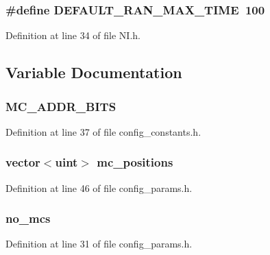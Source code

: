 \subsubsection[{DEFAULT\_\-RAN\_\-MAX\_\-TIME}]{\setlength{\rightskip}{0pt plus 5cm}\#define DEFAULT\_\-RAN\_\-MAX\_\-TIME~100}\label{NI_8h_95a6218d50e244f6e58b6cca098c1d65}




Definition at line 34 of file NI.h.

\subsection{Variable Documentation}
\subsubsection[{MC\_\-ADDR\_\-BITS}]{ {\bf MC\_\-ADDR\_\-BITS}}\label{NI_8h_5ef66c602b93d3db97dac0d557e7c84b}




Definition at line 37 of file config\_\-constants.h.
\subsubsection[{mc\_\-positions}]{\setlength{\rightskip}{0pt plus 5cm}vector$<${\bf uint}$>$ {\bf mc\_\-positions}}\label{NI_8h_f58ebe62f79b2e470f0cb7da0f7a7ea5}




Definition at line 46 of file config\_\-params.h.
\subsubsection[{no\_\-mcs}]{ {\bf no\_\-mcs}}\label{NI_8h_56d27d790e05179f3787fce80d802d04}




Definition at line 31 of file config\_\-params.h.